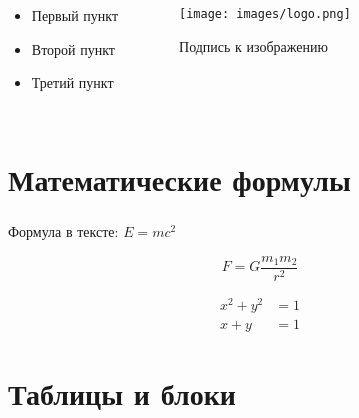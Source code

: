 \documentclass[aspectratio=169, t]{beamer}  %
\begin{document}
\begin{frame}
    \frametitle{\insertsection}
    \framesubtitle{\insertsubsection}
    
    \begin{columns}
        \begin{itemize}
            \item Первый пункт
            \item Второй пункт
            \item Третий пункт
        \end{itemize}
        
        \begin{figure}
            \centering
            \texttt{[image: images/logo.png]}
            \caption{Подпись к изображению}
        \end{figure}
    \end{columns}
    
\end{frame}

\section{Математические формулы}

\begin{frame}
    \frametitle{\insertsection}
    
    Формула в тексте: $E = mc^2$
    
    \begin{equation}
        F = G \frac{m_1 m_2}{r^2}
    \end{equation}
    
    \begin{align}
        x^2 + y^2 &= 1 \\
        x + y &= 1
    \end{align}
    
\end{frame}

\section{Таблицы и блоки}
\end{document}
